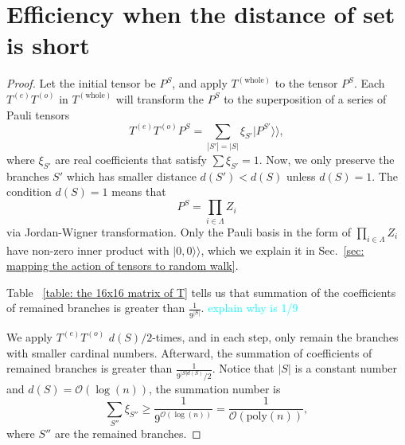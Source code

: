 \documentclass{article}
\newcommand{\Twhole}{T^{(\text{whole})}}
\newcommand{\supket}[1]{|#1 \rangle\rangle}
\begin{document}


\section{Efficiency when the distance of set is short}



\begin{proof}
    Let the initial tensor be $P^S$, and apply $\Twhole$ to the tensor $P^S$. Each $T^{(e)}T^{(o)}$ in $\Twhole$ will transform the $P^S$ to the superposition of a series of Pauli tensors
    \begin{equation}
        T^{(e)}T^{(o)} P^S = \sum_{|S'| = |S|} \xi_{S'} \supket{P^{S'}},
    \end{equation}
    where $\xi_{S'}$ are real coefficients that satisfy $\sum \xi_{S'} = 1$. Now, we only preserve the branches $S'$ which has smaller distance $d(S') < d(S)$ unless $d(S) = 1$. The condition $d(S) = 1$ means that 
    \begin{equation}
    P^S = \prod_{i\in \Lambda} Z_i    
    \end{equation}
    via Jordan-Wigner transformation. Only the Pauli basis in the form of $\prod_{i\in \Lambda} Z_i$ have non-zero inner product with $\supket{0,0}$, which we explain it in Sec.~\ref{sec: mapping the action of tensors to random walk}.

    Table ~\ref{table: the 16x16 matrix of T} tells us that summation of the coefficients of remained branches is greater than $\frac{1}{9^{|S|}}$. \textcolor{cyan}{explain why is 1/9} 

    We apply $T^{(e)}T^{(o)}$ $d(S)/2$-times, and in each step, only remain the branches with smaller cardinal numbers. Afterward, the summation of coefficients of remained branches is greater than $\frac{1}{9^{|S| d(S)}/2}$. Notice that $|S|$ is a constant number and $d(S) = \mathcal{O}(\log(n))$, the summation number is 
    \begin{equation}
        \sum_{S''} \xi_{S''} \geq  \frac{1}{9^{\mathcal{O}(\log(n))}} = \frac{1}{\mathcal{O}(\mathrm{poly}(n))},
    \end{equation}
    where $S''$ are the remained branches.
\end{proof}


\end{document}
